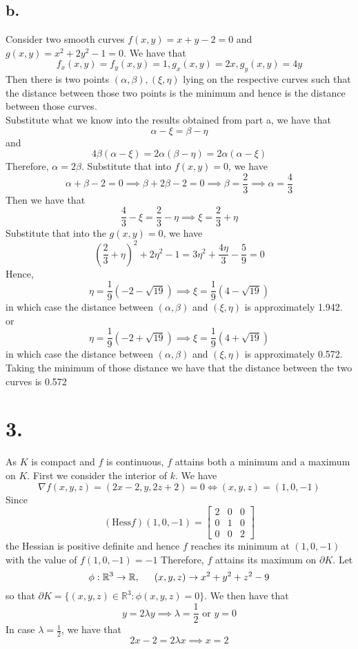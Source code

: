 \documentclass[11pt]{article}
\begin{document}
\subsection*{b.}
Consider two smooth curves $f(x,y) = x + y - 2 = 0$ and $g(x,y) = x^2+2y^2-1=0$.
We have that
\[
    f_x(x,y) = f_y(x,y) = 1, g_x(x,y) = 2x, g_y(x,y) = 4y    
\]
Then there is two points $(\alpha,\beta), (\xi,\eta)$ lying on the respective curves such that 
the distance between those two points is the minimum and hence is the distance between those curves. \\
Substitute what we know into the results obtained from part a, we have that
\[
    \alpha-\xi = \beta - \eta     
\] 
and 
\[
    4\beta (\alpha-\xi) = 2\alpha (\beta-\eta) = 2\alpha(\alpha-\xi)    
\]
Therefore, $\alpha = 2\beta$. Substitute that into $f(x,y) = 0$, we have
\[
    \alpha + \beta - 2 = 0 \implies \beta + 2\beta - 2 = 0 \implies \beta = \frac{2}{3} \implies \alpha = \frac{4}{3}    
\]
Then we have that
\[
    \frac{4}{3} - \xi = \frac{2}{3}- \eta \implies \xi = \frac{2}{3} + \eta
\]
Substitute that into the $g(x,y) = 0$, we have
\[
    \left(\frac{2}{3} + \eta\right)^2 + 2\eta^2 - 1 = 3 \eta^{2} + \frac{4 \eta}{3} - \frac{5}{9} = 0
\]
Hence, 
\[
    \eta = \frac{1}{9} (-2-\sqrt{19}) \implies \xi = \frac{1}{9}(4 - \sqrt{19})    
\]
in which case the distance between $(\alpha,\beta)$ and $(\xi,\eta)$ is approximately 1.942.
or 
\[
    \eta = \frac{1}{9} (-2+\sqrt{19}) \implies \xi = \frac{1}{9}(4 + \sqrt{19}) 
\]
in which case the distance between $(\alpha,\beta)$ and $(\xi,\eta)$ is approximately 0.572. \\
Taking the minimum of those distance we have that the distance between the two curves is 0.572
\pagebreak
\section*{3.}
As $K$ is compact and $f$ is continuous, $f$ attains both a minimum and a maximum on $K$. First we consider the interior of $k$.
We have
\[
    \nabla f(x,y,z) = (2x-2,y,2z+2) = 0 \iff (x,y,z) = (1,0,-1)
\]
Since 
\[
    (\text{Hess} f)(1,0,-1) = 
    \begin{bmatrix}
        2 & 0 & 0 \\
        0 & 1 & 0 \\
        0 & 0 & 2 
    \end{bmatrix}    
\]
the Hessian is positive definite and hence $f$ reaches its minimum at $(1,0,-1)$ with the value of $f(1,0,-1) = -1$ Therefore, $f$ attains its maximum on 
$\partial K$. Let 
\[
    \phi: \mathbb{R}^3 \to \mathbb{R}, \indent (x,y,z) \to x^2 + y^2 + z^2 - 9    
\]
so that $\partial K = \{(x,y,z)\in \mathbb{R}^3: \phi(x,y,z) = 0\}$. We then have that 
\[
    y = 2\lambda y \implies \lambda = \frac{1}{2} \text{ or } y=0
\]
In case $\lambda = \frac{1}{2}$, we have that 
\[
    2x-2 = 2\lambda x \implies x = 2
\]
\end{document}
